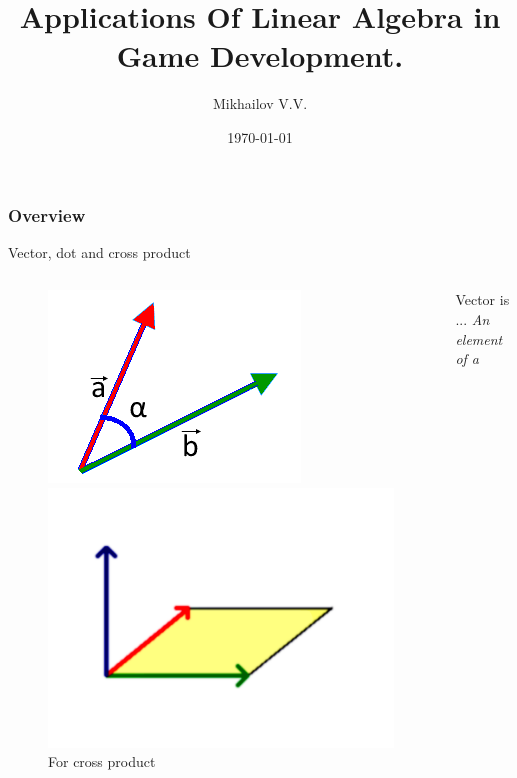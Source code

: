 \documentclass[10pt]{beamer}
\title[Linear Algebra In GameDev]{Applications Of Linear Algebra in Game Development.}
\author{Mikhailov V.V.}
\institute[]{}
\date{\today}
\begin{document}
\begin{frame}
\titlepage
\end{frame}

\begin{frame}
\frametitle{Overview} 
\tableofcontents 
\end{frame}

\begin{frame}[t]{Vector, dot and cross product}

\begin{columns}[t,onlytextwidth]
    \begin{figure}[!htb]
      \begin{minipage}[h]{0.9\linewidth}
      \centering
      \includegraphics[width = 0.6 \linewidth ]{dot_product.png}
      \caption{\small{For dot product}}
      \label{graph:dot_product}
      \end{minipage}
      \begin{minipage}[h]{1.0\linewidth}
      \centering
      \includegraphics[width = 0.7 \linewidth ]{cross_product.png}
      \caption{\small{For cross product}}
      \label{graph:cross_product}
      \end{minipage}
    \end{figure}
    \begin{block}{Vector is ...}
     \textit{An element of a \color{red}{vector space}}
    \end{block}
   

\end{columns}
\end{frame}
\end{document}
